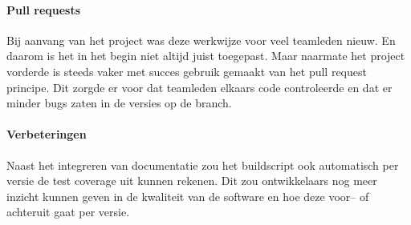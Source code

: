 \paragraph{Pull requests}
Bij aanvang van het project was deze werkwijze voor veel teamleden nieuw. En daarom is het in het begin niet altijd juist toegepast. Maar naarmate het project vorderde is steeds vaker met succes gebruik gemaakt van het pull request principe. Dit zorgde er voor dat teamleden elkaars code controleerde en dat er minder bugs zaten in de versies op de  branch.

\paragraph{Verbeteringen} Naast het integreren van documentatie zou het buildscript ook automatisch per versie de test coverage uit kunnen rekenen. Dit zou ontwikkelaars nog meer inzicht kunnen geven in de kwaliteit van de software en hoe deze voor– of achteruit gaat per versie.

